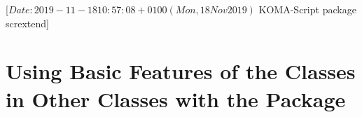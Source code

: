 %
%
%
%
%
%
%
%
% 
%
%
%
%

                 [$Date: 2019-11-18 10:57:08 +0100 (Mon, 18 Nov 2019) $
                  KOMA-Script package scrextend]


\chapter[{\KOMAScript{} Features for Other Classes with \Package{scrextend}}]
  {Using Basic Features of the \KOMAScript{} Classes in Other Classes with the
     Package}
\BeginIndexGroup%
%


